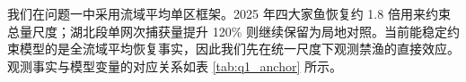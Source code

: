 我们在问题一中采用流域平均单区框架。2025 年四大家鱼恢复约 1.8 倍用来约束总量尺度；湖北段单网次捕获量提升 120\% 则继续保留为局地对照。当前能稳定约束模型的是全流域平均恢复事实，因此我们先在统一尺度下观测禁渔的直接效应。观测事实与模型变量的对应关系如表 \ref{tab:q1_anchor} 所示。
